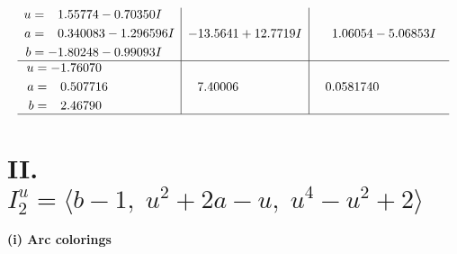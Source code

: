 \documentclass[1p]{elsarticle_modified}
\theoremstyle{definition}
\begin{document}
$$\begin{array}{c|c|c}
\begin{aligned}
u &= \phantom{-}1.55774 - 0.70350 I \\
a &= \phantom{-}0.340083 - 1.296596 I \\
b &= -1.80248 - 0.99093 I\end{aligned}
 & -13.5641 + 12.7719 I & \phantom{-}1.06054 - 5.06853 I \\ \hline\begin{aligned}
u &= -1.76070\phantom{ +0.000000I} \\
a &= \phantom{-}0.507716\phantom{ +0.000000I} \\
b &= \phantom{-}2.46790\phantom{ +0.000000I}\end{aligned}
 & \phantom{-}7.40006\phantom{ +0.000000I} & \phantom{-}0.0581740\phantom{ +0.000000I}\\
 \hline 
 \end{array}$$\newpage\newpage\renewcommand{\arraystretch}{1}
\centering \section*{II. $I^u_{2}= \langle b-1,\;u^2+2 a- u,\;u^4- u^2+2 \rangle$}
\flushleft \textbf{(i) Arc colorings}\\
\end{document}

